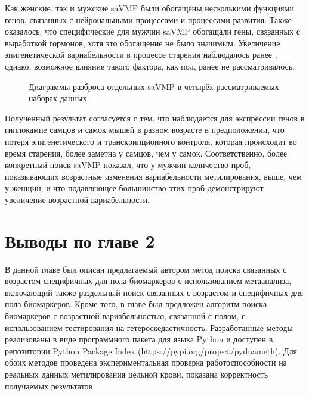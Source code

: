 Как женские, так и мужские saVMP были обогащены несколькими функциями генов, связанных с нейрональными процессами и процессами развития. Также оказалось, что специфические для мужчин saVMP обогащали гены, связанных с выработкой гормонов, хотя это обогащение не было значимым. Увеличение эпигенетической вариабельности в процессе старения наблюдалось ранее \autocite{Slieker2016}, однако, возможное влияние такого фактора, как пол, ранее не рассматривалось. 

\begin{figure}[ht]
	\caption[Диаграммы разброса отдельных saVMP в четырёх рассматриваемых наборах данных.]{Диаграммы разброса отдельных saVMP в четырёх рассматриваемых наборах данных.}\label{fig:saVMP}
\end{figure}

Полученный результат согласуется с тем, что наблюдается для экспрессии генов в гиппокампе самцов и самок мышей в разном возрасте \autocite{Mangold2017} в предположении, что потеря эпигенетического и транскрипционного контроля, которая происходит во время старения, более заметна у самцов, чем у самок. Соответственно, более конкретный поиск saVMP показал, что у мужчин количество проб, показывающих возрастные изменения вариабельности метилирования, выше, чем у женщин, и что подавляющее большинство этих проб демонстрируют увеличение возрастной вариабельности.

\section*{Выводы по главе 2} \label{sec:ch2/conclusion}                       

В данной главе был описан предлагаемый автором метод поиска связанных с возрастом специфичных для пола биомаркеров с использованием метаанализа, включающий также раздельный поиск связанных с возрастом и специфичных для пола биомаркеров. Кроме того, в главе был предложен алгоритм поиска биомаркеров с возрастной вариабельностью, связанной с полом, с использованием тестирования на гетероскедастичность. Разработанные методы реализованы в виде программного пакета для языка Python и доступен в репозитории Python Package Index (https://pypi.org/project/pydnameth). Для обоих методов проведена экспериментальная проверка работоспособности на реальных данных метилирования цельной крови, показана корректность получаемых результатов.

\FloatBarrier
